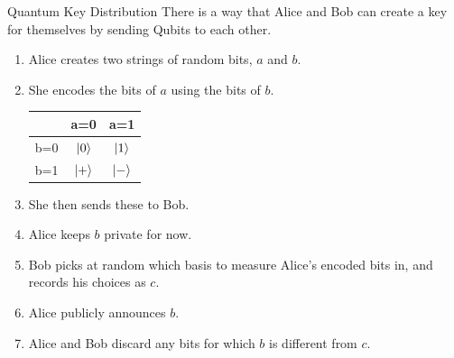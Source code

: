 \documentclass{beamer}
\begin{document}
\begin{frame}{Quantum Key Distribution}
    There is a way that Alice and Bob can create a key for themselves by sending Qubits to each other.\vfill
    \begin{enumerate}
        \item Alice creates two strings of random bits, $a$ and $b$.
        \pause
        \item She encodes the bits of $a$ using the bits of $b$.
        \begin{center}
            \begin{tabular}{|l|c c|}
                \hline
                 & a=0 & a=1 \\
                \hline
                b=0 & $\ket{0}$ & $\ket{1}$ \\
                b=1 & $\ket{+}$ & $\ket{-}$ \\
                \hline
            \end{tabular}
        \end{center}
        
        \pause
        \item She then sends these to Bob.
        \pause
        \item Alice keeps $b$ private for now.
        \pause
        \item Bob picks at random which basis to measure Alice's encoded bits in, and records his choices as $c$.
        \pause
        \item Alice publicly announces $b$.
        \pause
        \item Alice and Bob discard any bits for which $b$ is different from $c$.
    \end{enumerate}
\end{frame}
\end{document}
